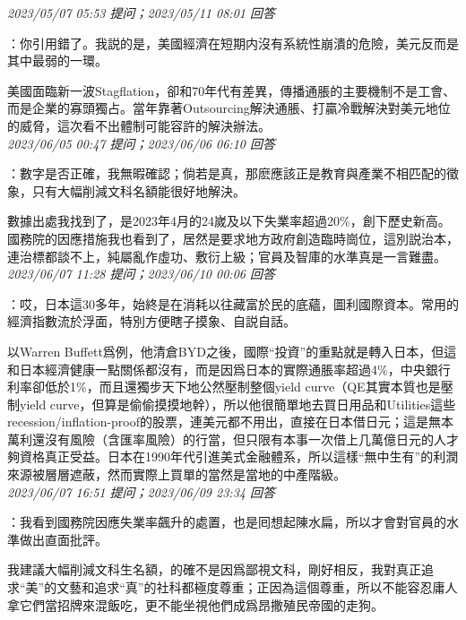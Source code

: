 \documentclass[twocolumn]{ctexart}
\begin{document}
\textit{\hfill\noindent\small 2023/05/07 05:53 提问；2023/05/11 08:01 回答}

：你引用錯了。我説的是，美國經濟在短期内沒有系統性崩潰的危險，美元反而是其中最弱的一環。

美國面臨新一波Stagflation，卻和70年代有差異，傳播通脹的主要機制不是工會、而是企業的寡頭獨占。當年靠著Outsourcing解決通脹、打贏冷戰解決對美元地位的威脅，這次看不出體制可能容許的解決辦法。
\\

\textit{\hfill\noindent\small 2023/06/05 00:47 提问；2023/06/06 06:10 回答}

：數字是否正確，我無暇確認；倘若是真，那麽應該正是教育與產業不相匹配的徵象，只有大幅削減文科名額能很好地解決。


數據出處我找到了，是2023年4月的24嵗及以下失業率超過20\%，創下歷史新高。國務院的因應措施我也看到了，居然是要求地方政府創造臨時崗位，這別説治本，連治標都談不上，純屬亂作虛功、敷衍上級；官員及智庫的水準真是一言難盡。
\\

\textit{\hfill\noindent\small 2023/06/07 11:28 提问；2023/06/10 00:06 回答}

：哎，日本這30多年，始終是在消耗以往藏富於民的底蘊，圖利國際資本。常用的經濟指數流於浮面，特別方便瞎子摸象、自説自話。

以Warren Buffett爲例，他清倉BYD之後，國際“投資”的重點就是轉入日本，但這和日本經濟健康一點關係都沒有，而是因爲日本的實際通脹率超過4\%，中央銀行利率卻低於1\%，而且還獨步天下地公然壓制整個yield curve（QE其實本質也是壓制yield curve，但算是偷偷摸摸地幹），所以他很簡單地去買日用品和Utilities這些recession/inflation-proof的股票，連美元都不用出，直接在日本借日元；這是無本萬利還沒有風險（含匯率風險）的行當，但只限有本事一次借上几萬億日元的人才夠資格真正受益。日本在1990年代引進美式金融體系，所以這樣“無中生有”的利潤來源被層層遮蔽，然而實際上買單的當然是當地的中產階級。
\\

\textit{\hfill\noindent\small 2023/06/07 16:51 提问；2023/06/09 23:34 回答}

：我看到國務院因應失業率飆升的處置，也是囘想起陳水扁，所以才會對官員的水準做出直面批評。

我建議大幅削減文科生名額，的確不是因爲鄙視文科，剛好相反，我對真正追求“美”的文藝和追求“真”的社科都極度尊重；正因為這個尊重，所以不能容忍庸人拿它們當招牌來混飯吃，更不能坐視他們成爲昂撒殖民帝國的走狗。
\\
\end{document}
